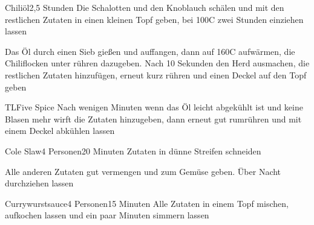 
\begin{recipe}{Chiliöl}{}{2,5 Stunden}
Die Schalotten und den Knoblauch schälen und mit den restlichen Zutaten in einen kleinen Topf geben, bei 100\0C zwei Stunden einziehen lassen

Das Öl durch einen Sieb gießen und auffangen, dann auf 160\0C aufwärmen, die Chiliflocken unter rühren dazugeben. Nach 10 Sekunden den Herd ausmachen, die restlichen Zutaten hinzufügen, erneut kurz rühren und einen Deckel auf den Topf geben

\ing[1/4]TL{}{Five Spice}
Nach wenigen Minuten wenn das Öl leicht abgekühlt ist und keine Blasen mehr wirft die Zutaten hinzugeben, dann erneut gut rumrühren und mit einem Deckel abkühlen lassen
\end{recipe}


\begin{recipe}{Cole Slaw}{4 Personen}{20 Minuten}
Zutaten in dünne Streifen schneiden

Alle anderen Zutaten gut vermengen und zum Gemüse geben.
Über Nacht durchziehen lassen
\end{recipe}


\begin{recipe}{Currywurstsauce}{4 Personen}{15 Minuten}
Alle Zutaten in einem Topf mischen, aufkochen lassen und ein paar Minuten simmern lassen

\end{recipe} 

